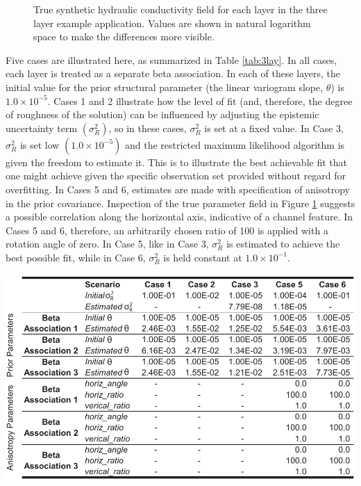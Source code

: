 \documentclass[11pt,oneside,onecolumn]{usgsreport}
\begin{document}
\begin{appendix}
\begin{figure}[!t]
\caption{\label{3Ltruek}True synthetic hydraulic conductivity field for each
layer in the three layer example application. Values are shown in
natural logarithm space to make the differences more visible.}


\end{figure}


Five cases are illustrated here, as summarized in Table \ref{tab:3lay}.
In all cases, each layer is treated as a separate beta association.
In each of these layers, the initial value for the prior structural
parameter (the linear variogram slope, $\theta$) is $1.0\times10^{-5}$.
Cases 1 and 2 illustrate how the level of fit (and, therefore, the
degree of roughness of the solution) can be influenced by adjusting
the epistemic uncertainty term $\left(\sigma_{R}^{2}\right)$, so
in these cases, $\sigma_{R}^{2}$ is set at a fixed value. In Case
3, $\sigma_{R}^{2}$ is set low $\left(1.0\times10^{-5}\right)$ and
the restricted maximum likelihood algorithm is given the freedom to
estimate it. This is to illustrate the best achievable fit that one
might achieve given the specific observation set provided without
regard for overfitting. In Cases 5 and 6, estimates are made with
specification of anisotropy in the prior covariance. Inspection of
the true parameter field in Figure \ref{3Ltruek} suggests a possible
correlation along the horizontal axis, indicative of a channel feature.
In Cases 5 and 6, therefore, an arbitrarily chosen ratio of 100 is
applied with a rotation angle of zero. In Case 5, like in Case 3,
$\sigma_{R}^{2}$ is estimated to achieve the best possible fit, while
in Case 6, $\sigma_{R}^{2}$ is held constant at $1.0\times10^{-1}.$

\begin{table}[!t]
\begin{center}\includegraphics[scale=0.9]{tables/3_layer_tables_for_structural_parameters}\end{center}


\end{table}
\end{appendix}
\end{document}
